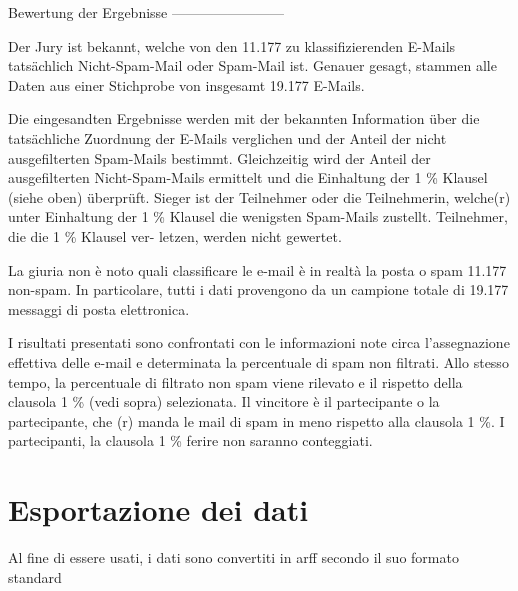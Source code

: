 Bewertung der Ergebnisse
------------------------

Der Jury ist bekannt, welche von den 11.177 zu klassifizierenden
E-Mails tatsächlich Nicht-Spam-Mail oder Spam-Mail ist. Genauer
gesagt, stammen alle Daten aus einer Stichprobe von insgesamt
19.177 E-Mails.

Die eingesandten Ergebnisse werden mit der bekannten Information über
die tatsächliche Zuordnung der E-Mails verglichen und der Anteil der
nicht ausgefilterten Spam-Mails bestimmt. Gleichzeitig wird der Anteil
der ausgefilterten Nicht-Spam-Mails ermittelt und die Einhaltung
der 1 \% Klausel (siehe oben) überprüft. Sieger ist der Teilnehmer
oder die Teilnehmerin, welche(r) unter Einhaltung der 1 \% Klausel die
wenigsten Spam-Mails zustellt. Teilnehmer, die die 1 \% Klausel ver-
letzen, werden nicht gewertet.

La giuria non è noto quali classificare le e-mail è in realtà la posta o spam 11.177 non-spam. In particolare, tutti i dati provengono da un campione totale di 19.177 messaggi di posta elettronica.

I risultati presentati sono confrontati con le informazioni note circa l'assegnazione effettiva delle e-mail e determinata la percentuale di spam non filtrati. Allo stesso tempo, la percentuale di filtrato non spam viene rilevato e il rispetto della clausola 1 \% (vedi sopra) selezionata. Il vincitore è il partecipante o la partecipante, che (r) manda le mail di spam in meno rispetto alla clausola 1 \%. I partecipanti, la clausola 1 \% ferire non saranno conteggiati.
\section{Esportazione dei dati}
Al fine di essere usati, i dati sono convertiti in arff secondo il suo formato standard

